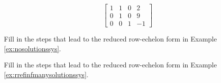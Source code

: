 \documentclass{ximera}
\begin{document}
\begin{problem}
   \begin{problem}\label{prob:rrefmultchoice5}
  $$\left[\begin{array}{ccc|c}  
 1&1&0&2\\0&1&0&9\\0&0&1&-1
 \end{array}\right]$$
 \begin{multipleChoice}
 \end{multipleChoice}
  \end{problem}
  
\end{problem}

\begin{problem}\label{prob:rrefnosolutionssys}
Fill in the steps that lead to the reduced row-echelon form in Example \ref{ex:nosolutionssys}.
\end{problem}

\begin{problem}\label{prob:rreffinfmanysolutionsys}
Fill in the steps that lead to the reduced row-echelon form in Example \ref{ex:rrefinfmanysolutionssys}.
\end{problem}
\end{document}
